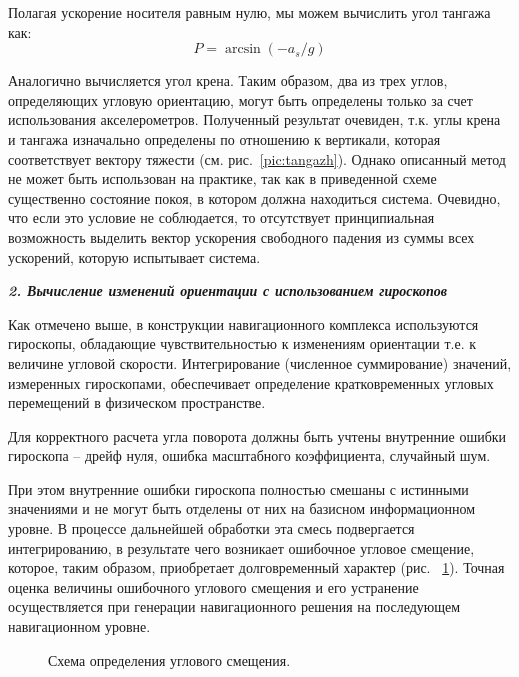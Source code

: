 Полагая ускорение носителя равным нулю, мы можем вычислить угол тангажа как:
$$P = \arcsin (-a_s/g)$$

Аналогично вычисляется угол крена. Таким образом, два из трех углов, определяющих угловую ориентацию, могут быть определены только за счет использования акселерометров. Полученный результат очевиден, т.к. углы крена и тангажа изначально определены по отношению к вертикали, которая соответствует вектору тяжести (см. рис.~\ref{pic:tangazh}). Однако описанный метод не может быть использован на практике, так как в приведенной схеме существенно состояние покоя, в котором должна находиться система. Очевидно, что если это условие не соблюдается, то отсутствует принципиальная возможность выделить вектор ускорения свободного падения из суммы всех ускорений, которую испытывает система.

\textit{\textbf{2. Вычисление изменений ориентации с использованием гироскопов}}

Как отмечено выше, в конструкции навигационного комплекса используются гироскопы, обладающие чувствительностью к изменениям ориентации т.е. к величине угловой скорости. Интегрирование (численное суммирование) значений, измеренных гироскопами, обеспечивает определение кратковременных угловых перемещений в физическом пространстве.

Для корректного расчета угла поворота должны быть учтены
внутренние ошибки гироскопа – дрейф нуля, ошибка масштабного коэффициента, случайный шум.

\label{ref:dreif0}
При этом внутренние ошибки  гироскопа полностью смешаны с истинными значениями и не могут быть отделены от них на базисном информационном уровне. В процессе дальнейшей обработки эта смесь подвергается интегрированию, в результате чего возникает ошибочное угловое смещение, которое, таким образом, приобретает долговременный характер (рис. ~\ref{pic:acell}). Точная оценка величины ошибочного углового смещения и его устранение осуществляется при генерации навигационного решения на последующем навигационном уровне.

\begin{figure}[!htb]
\caption{Схема определения углового смещения.}
\label{pic:acell}
\end{figure}

